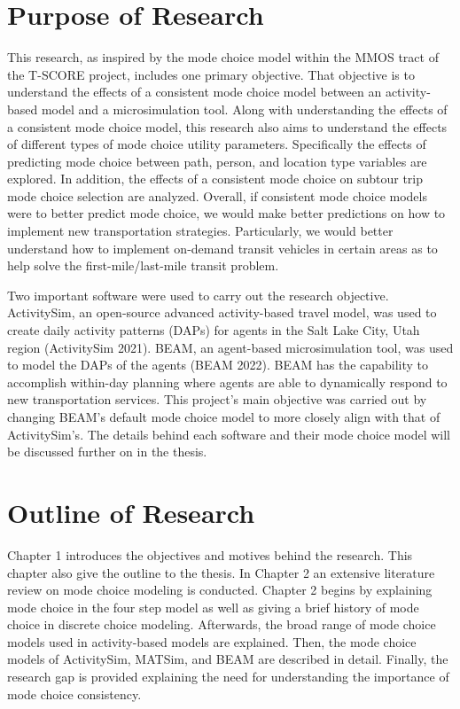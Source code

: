 \documentclass[12pt, oneside, openright]{byuthesis}
\begin{document}
\hypertarget{purpose-of-research}{%
\section{Purpose of Research}\label{purpose-of-research}}

This research, as inspired by the mode choice model within the MMOS tract of the T-SCORE project, includes one primary objective. That objective is to understand the effects of a consistent mode choice model between an activity-based model and a microsimulation tool. Along with understanding the effects of a consistent mode choice model, this research also aims to understand the effects of different types of mode choice utility parameters. Specifically the effects of predicting mode choice between path, person, and location type variables are explored. In addition, the effects of a consistent mode choice on subtour trip mode choice selection are analyzed. Overall, if consistent mode choice models were to better predict mode choice, we would make better predictions on how to implement new transportation strategies. Particularly, we would better understand how to implement on-demand transit vehicles in certain areas as to help solve the first-mile/last-mile transit problem.

Two important software were used to carry out the research objective. ActivitySim, an open-source advanced activity-based travel model, was used to create daily activity patterns (DAPs) for agents in the Salt Lake City, Utah region (ActivitySim 2021). BEAM, an agent-based microsimulation tool, was used to model the DAPs of the agents (BEAM 2022). BEAM has the capability to accomplish within-day planning where agents are able to dynamically respond to new transportation services. This project's main objective was carried out by changing BEAM's default mode choice model to more closely align with that of ActivitySim's. The details behind each software and their mode choice model will be discussed further on in the thesis.

\hypertarget{outline-of-research}{%
\section{Outline of Research}\label{outline-of-research}}

Chapter 1 introduces the objectives and motives behind the research. This chapter also give the outline to the thesis. In Chapter 2 an extensive literature review on mode choice modeling is conducted. Chapter 2 begins by explaining mode choice in the four step model as well as giving a brief history of mode choice in discrete choice modeling. Afterwards, the broad range of mode choice models used in activity-based models are explained. Then, the mode choice models of ActivitySim, MATSim, and BEAM are described in detail. Finally, the research gap is provided explaining the need for understanding the importance of mode choice consistency.
\end{document}
